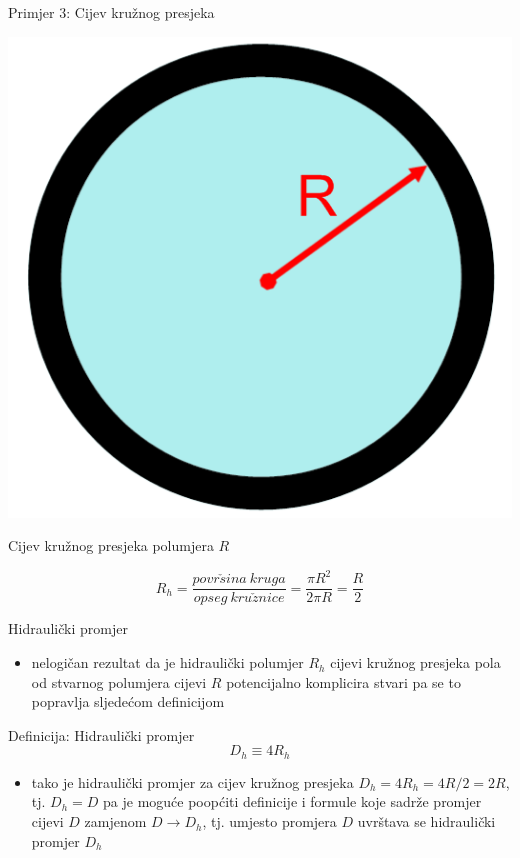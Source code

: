 \documentclass{beamer}
\begin{document}
\begin{frame}{Primjer 3: Cijev kružnog presjeka}

\begin{center}
\includegraphics[width=0.3\paperwidth]{slike/slika5.PNG}
\par\end{center}
\begin{example}
{Cijev kružnog presjeka polumjera $R$}

\[
R_{h}=\frac{povr\check{s}ina\:kruga}{opseg\:kru\check{z}nice}=\frac{\pi R^{2}}{2\pi R}=\frac{R}{2}
\]

\end{example}

\end{frame}

\begin{frame}{Hidraulički promjer}

\begin{itemize}
\item nelogičan rezultat da je hidraulički polumjer $R_{h}$ cijevi kružnog
presjeka pola od stvarnog polumjera cijevi $R$ potencijalno komplicira
stvari pa se to popravlja sljedećom definicijom
\end{itemize}
\begin{alertblock}{Definicija: Hidraulički promjer}
\[
D_{h}\equiv4R_{h}
\]
\end{alertblock}
\begin{itemize}
\item tako je hidraulički promjer za cijev kružnog presjeka $D_{h}=4R_{h}=4R/2=2R$,
tj. $D_{h}=D$ pa je moguće poopćiti definicije i formule koje sadrže
promjer cijevi $D$ zamjenom $D\rightarrow D_{h}$, tj. umjesto promjera
$D$ uvrštava se hidraulički promjer $D_{h}$
\end{itemize}
\end{frame}
\end{document}
